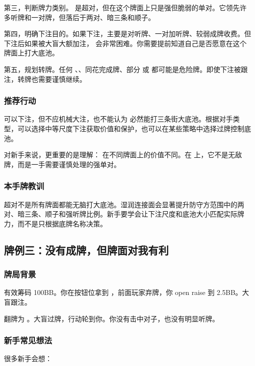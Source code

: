 第三，判断牌力类别。 是超对，但在这个牌面上只是强但脆弱的单对。它领先许多听牌和一对牌，但落后于两对、暗三条和顺子。

第四，明确下注目的。如果下注，主要是对听牌、一对加听牌、较弱成牌收费。但下注后如果被大盲大额加注， 会非常困难。你需要提前知道自己是否愿意在这个牌面上打大底池。

第五，规划转牌。任何 、、同花完成牌、部分  或  都可能是危险牌。即使下注被跟注，转牌也需要谨慎继续。

\subsubsection*{推荐行动}

可以下注，但不应机械大注，也不能认为  必然能打三条街大底池。根据对手类型，可以选择中等尺度下注获取价值和保护，也可以在某些策略中选择过牌控制底池。

对新手来说，更重要的是理解： 在不同牌面上的价值不同。在  上，它不是无敌牌，而是一手需要谨慎处理的强单对。

\subsubsection*{本手牌教训}

超对不是所有牌面都能无脑打大底池。湿润连接面会显著提升防守方范围中的两对、暗三条、顺子和强听牌比例。新手要学会让下注尺度和底池大小匹配实际牌力，而不是只根据底牌名称决策。

\subsection{牌例三：没有成牌，但牌面对我有利}

\subsubsection*{牌局背景}

有效筹码 100BB。你在按钮位拿到 ，前面玩家弃牌，你 open raise 到 2.5BB。大盲跟注。

翻牌为 。大盲过牌，行动轮到你。你没有击中对子，也没有明显听牌。

\subsubsection*{新手常见想法}

很多新手会想：

